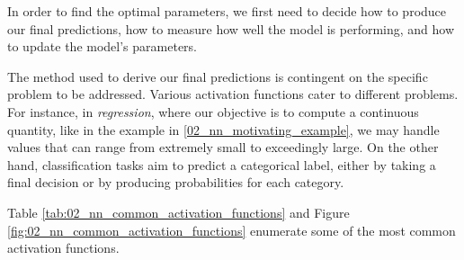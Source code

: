 In order to find the optimal parameters, we first need to decide how to produce our final predictions, how to measure how well the model is performing, and how to update the model's parameters.


\label{02_nn_activation_functions}


The method used to derive our final predictions is contingent on the specific problem to be addressed. Various activation functions cater to different problems. For instance, in \emph{regression}, where our objective is to compute a continuous quantity,  like in the example in \headerName{} \ref{02_nn_motivating_example}, we may handle values that can range from extremely small to exceedingly large. On the other hand, classification tasks aim to predict a categorical label, either by taking a final decision or by producing probabilities for each category.


Table \ref{tab:02_nn_common_activation_functions} and Figure \ref{fig:02_nn_common_activation_functions} enumerate some of the most common activation functions.



